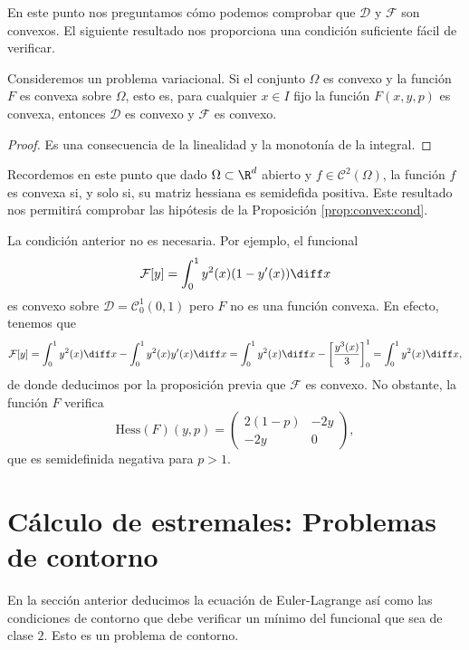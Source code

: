 \documentclass{article}
\begin{document}
En este punto nos preguntamos cómo podemos comprobar que $\mathcal{D}$ y $\mathcal{F}$ son
convexos. El siguiente resultado nos proporciona una condición suficiente fácil de verificar.

\begin{prop} \label{prop:convex:cond} Consideremos un problema
  variacional. Si el conjunto $\Omega$ es convexo y la función $F$ es convexa sobre $\Omega$, esto
  es, para cualquier $x \in I$ fijo la función $F(x, y, p)$ es convexa, entonces $\mathcal{D}$ es
  convexo y $\mathcal{F}$ es convexo.
\end{prop}
\begin{proof}
  Es una consecuencia de la linealidad y la monotonía de la integral.
\end{proof}

\begin{remark}
  Recordemos en este punto que dado $\Omega \subset \R^d$ abierto y $f \in \mathcal{C}^2(\Omega)$,
  la función $f$ es convexa si, y solo si, su matriz hessiana es semidefida positiva. Este resultado
  nos permitirá comprobar las hipótesis de la Proposición \ref{prop:convex:cond}.
\end{remark}

\begin{remark}
  La condición anterior no es necesaria. Por ejemplo, el funcional
  \[ \mathcal{F}[y] = \int_0^1 y^2(x)(1 - y'(x)) \diff x \] es convexo sobre
  $\mathcal{D} = \mathcal{C}_0^1(0,1)$ pero $F$ no es una función convexa.  En efecto, tenemos que
  \[ \mathcal{F}[y] = \int_0^1 y^2(x) \diff x - \int_0^1 y^2(x)y'(x) \diff x = \int_0^1 y^2(x) \diff
    x - \left[ \frac{y^3(x)}{3}\right]^1_0 = \int_0^1 y^2(x) \diff x, \] de donde deducimos por la
  proposición previa que $\mathcal{F}$ es convexo. No obstante, la función $F$ verifica
  \[ \mathrm{Hess}(F)(y,p) = \left(
      \begin{matrix}
        2(1-p) & -2y \\
        -2y & 0
      \end{matrix}
    \right), \] que es semidefinida negativa para $p > 1$.
\end{remark}

\section{Cálculo de estremales: Problemas de contorno}

En la sección anterior deducimos la ecuación de Euler-Lagrange así como las condiciones de contorno
que debe verificar un mínimo del funcional que sea de clase $2$. Esto es un problema de contorno.
\end{document}
